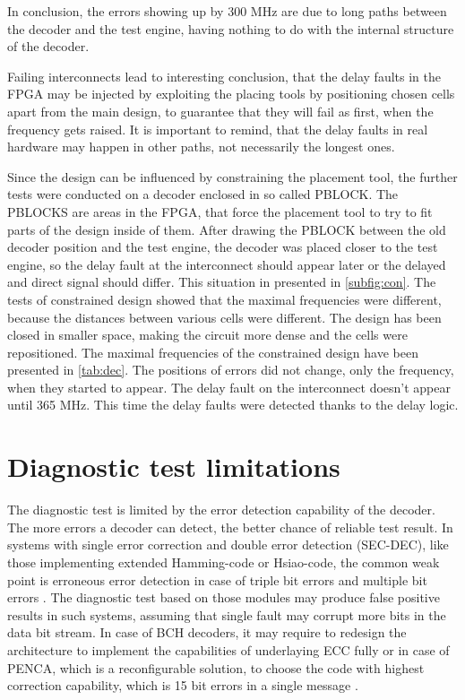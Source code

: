 In conclusion, the errors showing up by 300 MHz are due to long paths between the decoder and the test engine, having nothing to do with the internal structure of the decoder.

Failing interconnects lead to interesting conclusion, that the delay faults in the FPGA may be injected by exploiting the placing tools by positioning chosen cells apart from the main design, to guarantee that they will fail as first, when the frequency gets raised. It is important to remind, that the delay faults in real hardware may happen in other paths, not necessarily the longest ones.

Since the design can be influenced by constraining the placement tool, the further tests were conducted on a decoder enclosed in so called PBLOCK. The PBLOCKS are areas in the FPGA, that force the placement tool to try to fit parts of the design inside of them. After drawing the PBLOCK between the old decoder position and the test engine, the decoder was placed closer to the test engine, so the delay fault at the interconnect should appear later or the delayed and direct signal should differ. This situation in presented in \autoref{subfig:con}. The tests of constrained design showed that the maximal frequencies were different, because the distances between various cells were different. The design has been closed in smaller space, making the circuit more dense and the cells were repositioned. The maximal frequencies of the constrained design have been presented in \autoref{tab:dec}. The positions of errors did not change, only the frequency, when they started to appear. The delay fault on the interconnect doesn't appear until 365 MHz. This time the delay faults were detected thanks to the delay logic.


\section{Diagnostic test limitations}
The diagnostic test is limited by the error detection capability of the decoder. The more errors a decoder can detect, the better chance of reliable test result. In systems with single error correction and double error detection (SEC-DEC), like those implementing extended Hamming-code or Hsiao-code, the common weak point is erroneous error detection in case of triple bit errors and multiple bit errors \cite{art:art:Dicorato}. The diagnostic test based on those modules may produce false positive results in such systems, assuming that single fault may corrupt more bits in the data bit stream. In case of BCH decoders, it may require to redesign the architecture to implement the capabilities of underlaying ECC fully or in case of PENCA, which is a reconfigurable solution, to choose the code with highest correction capability, which is 15 bit errors in a single message \cite{art:Pfeifer}.

